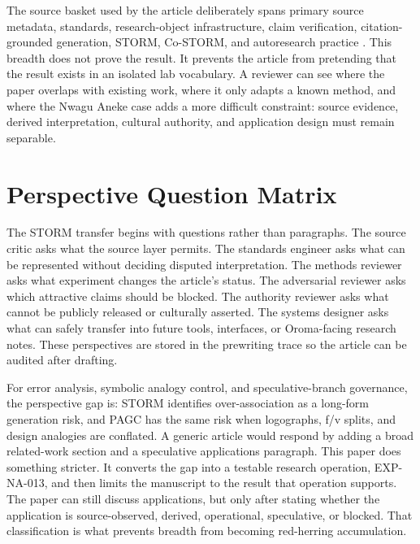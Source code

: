 \documentclass[sigconf,nonacm]{acmart}
\begin{document}
The source basket used by the article deliberately spans primary source
metadata, standards, research-object infrastructure, claim verification,
citation-grounded generation, STORM, Co-STORM, and autoresearch practice
\cite{azuonye1992,omniglotNwagu,unicodeAfricanScripts2023,scriptSourceNwagu,sirisNwaguProposal,teiP5Glyphs,iiifPresentation3,w3cAnnotationModel,w3cAnnotationVocab,w3cProvO,rocrate12,cidocCrm,datacite45,wilkinson2016fair,carroll2020care,wadden2020scifact,gao2023alce,karpathyAutoresearch,shao2024storm,jiang2024costorm,acmSubmissions,arxivSubmitTex}. This breadth does not prove the result. It prevents the article
from pretending that the result exists in an isolated lab vocabulary. A
reviewer can see where the paper overlaps with existing work, where it only
adapts a known method, and where the Nwagu Aneke case adds a more difficult
constraint: source evidence, derived interpretation, cultural authority, and
application design must remain separable.

\section{Perspective Question Matrix}
The STORM transfer begins with questions rather than paragraphs. The source
critic asks what the source layer permits. The standards engineer asks what can
be represented without deciding disputed interpretation. The methods reviewer
asks what experiment changes the article's status. The adversarial reviewer asks
which attractive claims should be blocked. The authority reviewer asks what
cannot be publicly released or culturally asserted. The systems designer asks
what can safely transfer into future tools, interfaces, or Oroma-facing
research notes. These perspectives are stored in the prewriting trace so the
article can be audited after drafting.

For error analysis, symbolic analogy control, and speculative-branch governance, the perspective gap is: STORM identifies over-association as a long-form generation risk, and PAGC has the same risk when logographs, f/v splits, and design analogies are conflated. A generic article would respond by
adding a broad related-work section and a speculative applications paragraph.
This paper does something stricter. It converts the gap into a testable
research operation, EXP-NA-013, and then limits the manuscript to the result
that operation supports. The paper can still discuss applications, but only
after stating whether the application is source-observed, derived, operational,
speculative, or blocked. That classification is what prevents breadth from
becoming red-herring accumulation.
\end{document}
